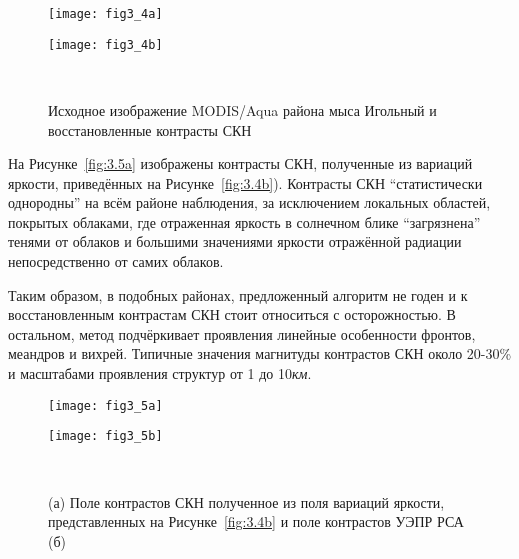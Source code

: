 {\begin{figure}[H]
   	\centering
	\begin{minipage}{.47\textwidth}
	    \subcaptionbox{\label{fig:3.4a}}
		{\texttt{[image: fig3\_4a]}}
	\end{minipage}
	\hfill
	\begin{minipage}{.47\textwidth}
	    \subcaptionbox{\label{fig:3.4b}}
		{\texttt{[image: fig3\_4b]}}
	\end{minipage}
    \\
    \caption{Исходное изображение MODIS/Aqua района мыса Игольный и восстановленные контрасты СКН}
    \label{fig:3.4}
\end{figure}


На Рисунке~\ref{fig:3.5a} изображены контрасты СКН, полученные из вариаций яркости, приведённых на Рисунке~\ref{fig:3.4b}). Контрасты СКН ``статистически однородны'' на всём районе наблюдения, за исключением локальных областей, покрытых облаками, где отраженная яркость в солнечном блике ``загрязнена'' тенями от облаков и большими значениями яркости отражённой радиации непосредственно от самих облаков. 

Таким образом, в подобных районах, предложенный алгоритм не годен и к восстановленным контрастам СКН стоит относиться с осторожностью. В остальном, метод подчёркивает проявления линейные особенности фронтов, меандров и вихрей. Типичные значения магнитуды контрастов СКН около 20-30\% и масштабами проявления структур от 1 до 10\textit{км}.



\begin{figure}[H]
   	\centering
	\begin{minipage}{.47\textwidth}
	    \subcaptionbox{\label{fig:3.5a}}
		{\texttt{[image: fig3\_5a]}}
	\end{minipage}
	\hfill
	\begin{minipage}{.47\textwidth}
	    \subcaptionbox{\label{fig:3.5b}}
		{\texttt{[image: fig3\_5b]}}
	\end{minipage}
    \\
    \caption{(а) Поле контрастов СКН полученное из поля вариаций яркости, представленных на Рисунке~\ref{fig:3.4b} и поле контрастов УЭПР РСА (б)}
    \label{fig:3.5}
\end{figure}


}
